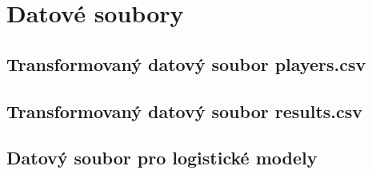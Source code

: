 \chapter{Datové soubory}
\section{Transformovaný datový soubor players.csv}


\section{Transformovaný datový soubor results.csv}


\section{Datový soubor pro logistické modely}

